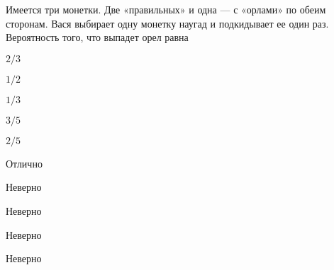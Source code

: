 
\begin{question}
Имеется три монетки. Две «правильных» и одна — с «орлами» по обеим
сторонам. Вася выбирает одну монетку наугад и подкидывает ее один раз.
Вероятность того, что выпадет орел равна
\begin{answerlist}
  \item \(2/3\)
  \item \(1/2\)
  \item \(1/3\)
  \item \(3/5\)
  \item \(2/5\)
\end{answerlist}
\end{question}

\begin{solution}
\begin{answerlist}
  \item Отлично
  \item Неверно
  \item Неверно
  \item Неверно
  \item Неверно
\end{answerlist}
\end{solution}

